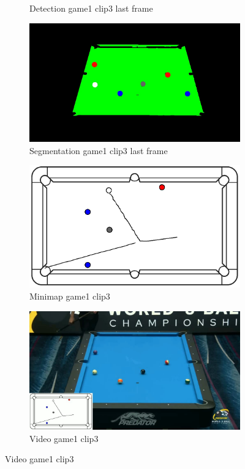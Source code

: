 \begin{figure}[H]
\begin{subfigure}[b]{0.48\textwidth}
		\caption{Detection game1 clip3 last frame}
		\label{fig: game1_clip3_last_frame_detected}
	\end{subfigure}
	\begin{subfigure}[b]{0.48\textwidth}
		\centering
		\includegraphics[width=\textwidth]{images/Segmentation/game1_clip3_segmented_balls_last_frame.jpg}
		\caption{Segmentation game1 clip3 last frame}
		\label{fig: game1_clip3_last_frame_segmented}
	\end{subfigure}
	\begin{subfigure}[b]{0.48\textwidth}
		\centering
		\includegraphics[width=\textwidth]{images/AllMinimap/game1_clip3_minimap.png}
		\caption{Minimap game1 clip3}
		\label{fig: game1_clip3_minimap}
	\end{subfigure}
	\begin{subfigure}[b]{0.48\textwidth}
		\centering
		\includegraphics[width=\textwidth]{images/Video/game1_clip3_video.jpg}
		\caption{Video game1 clip3}
		\label{fig: game1_clip3_video}
	\end{subfigure}


\end{figure}
